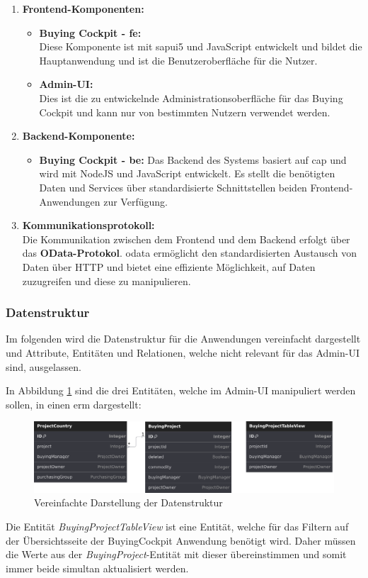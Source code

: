 \begin{enumerate}
    \item \textbf{Frontend-Komponenten:}
    \begin{itemize}
        \item \textbf{Buying Cockpit - \gls{fe}:} \\
        Diese Komponente ist mit \gls{sapui5} und JavaScript entwickelt und bildet die Hauptanwendung und ist die Benutzeroberfläche für die Nutzer.
        \item \textbf{Admin-UI:} \\
        Dies ist die zu entwickelnde Administrationsoberfläche für das Buying Cockpit und  kann nur von bestimmten Nutzern verwendet werden.
    \end{itemize} 
    \item \textbf{Backend-Komponente:}
    \begin{itemize}
        \item \textbf{Buying Cockpit - \gls{be}:}
        Das Backend des Systems basiert auf \gls{cap} und wird mit NodeJS und JavaScript entwickelt.
        Es stellt die benötigten Daten und Services über standardisierte Schnittstellen beiden Frontend-Anwendungen zur Verfügung.
    \end{itemize}
    \item \textbf{Kommunikationsprotokoll:} \\
    Die Kommunikation zwischen dem Frontend und dem Backend erfolgt über das \textbf{OData-Protokol}. 
    \gls{odata} ermöglicht den standardisierten Austausch von Daten über HTTP und bietet eine effiziente Möglichkeit, auf Daten zuzugreifen und diese zu manipulieren.
\end{enumerate}
\subsubsection[Datenstruktur]{Datenstruktur}
Im folgenden wird die Datenstruktur für die Anwendungen vereinfacht dargestellt und Attribute, Entitäten und Relationen, welche nicht relevant für das Admin-UI sind, ausgelassen.

In Abbildung \ref{fig:datastructure} sind die drei Entitäten, welche im Admin-UI manipuliert werden sollen, in einen \gls{erm} dargestellt: \\
\begin{figure}[H]
    \centering
    \includegraphics[width=\linewidth]{Images/Datenstruktur.png}
    \caption[Vereinfachte Darstellung der Datenstruktur]{Vereinfachte Darstellung der Datenstruktur}
    \label{fig:datastructure}
\end{figure}

Die Entität \textit{BuyingProjectTableView} ist eine Entität, welche für das Filtern auf der Übersichtsseite der BuyingCockpit Anwendung benötigt wird.
Daher müssen die Werte aus der \textit{BuyingProject}-Entität mit dieser übereinstimmen und somit immer beide simultan aktualisiert werden.